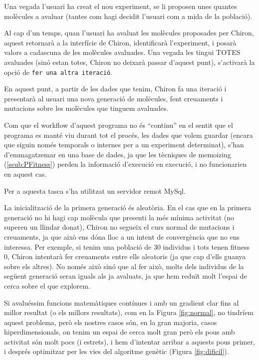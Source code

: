 Una vegada l'usuari ha creat el nou experiment, se li proposen unes quantes
molècules a avaluar (tantes com hagi decidit l'usuari com a mida de la
població).

Al cap d'un temps, quan l'usuari ha avaluat les molècules proposades per Chiron,
aquest retornarà a la interfície de Chiron, identificarà l'experiment, i posarà
valors a cadascuna de les molècules avaluades.  Una vegada les tingui TOTES
avaluades (sinó estan totes, Chiron no deixarà passar d'aquest punt), s'activarà
la opció de \texttt{fer una altra iteració}.  

En aquest punt, a partir de les dades que tenim, Chiron fa una iteració i
presentarà al usuari una nova generació de molècules, fent creuaments i
mutacions sobre les molècules que tinguem avaluades.

Com que el workflow d'aquest programa no és ``continu'' en el sentit que el
programa es manté viu durant tot el procés, les dades que volem guardar (encara
que siguin només temporals o internes per a un experiment determinat), s'han
d'emmagatzemar en una base de dades, ja que les tècniques de memoizing (\ref{ssub:PFitness})
perden la informació d'execució en execució, i no funcionarien en aquest cas.

Per a aquesta tasca s'ha utilitzat un servidor remot MySql.

La inicialització de la primera generació és aleatòria. En el cas que en la
primera generació no hi hagi cap molècula que presenti la més mínima activitat
(no superen un llindar donat), Chiron no segueix el curs normal de mutacions i
creuaments, ja que això ens dóna lloc a un intent de convergència que no ens
interessa.  Per exemple, si tenim una població de 30 individus i tots tenen
fitness 0, Chiron intentarà fer creuaments entre ells aleatoris (ja que cap
d'ells guanya sobre els altres).  No només això sinó que al fer això, molts dels
individus de la següent generació seran iguals als ja avaluats, ja que hem
reduït molt l'espai de cerca sobre el que explorem.

Si avaluéssim funcions matemàtiques contínues i amb un gradient clar fins al
millor resultat (o els millors resultats), com en la Figura \ref{fig:normal}, no
tindríem aquest problema, però els nostres casos són, en la gran majoria, casos
hiperdimensionals, on tenim un espai de cerca molt gran però els pous amb
activitat són molt pocs (i estrets), i hem d'intentar arribar a aquests pous
primer, i després optimitzar per les vies del algoritme genètic (Figura
\ref{fig:dificil}).

